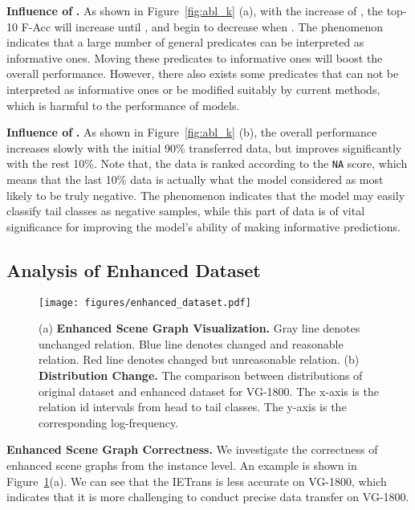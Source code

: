 \documentclass[runningheads]{llncs}
\begin{document}
\smallskip
\noindent
\textbf{Influence of }\textbf{.}
As shown in Figure~\ref{fig:abl_k} (a), with the increase of , the top-10 F-Acc will increase until , and begin to decrease when .
The phenomenon indicates that a large number of general predicates can be interpreted as informative ones.
Moving these predicates to informative ones will boost the overall performance.
However, there also exists some predicates that can not be interpreted as informative ones or be modified suitably by current methods, which is harmful to the performance of models.

\smallskip
\noindent
\textbf{Influence of }\textbf{.}
As shown in Figure~\ref{fig:abl_k} (b), the overall performance increases slowly with the initial 90\% transferred data, but improves significantly with the rest 10\%. 
Note that, the data is ranked according to the \texttt{NA} score, which means that the last 10\% data is actually what the model considered as most likely to be truly negative.
The phenomenon indicates that the model may easily classify tail classes as negative samples, while this part of data is of vital significance for improving the model's ability of making informative predictions.



\subsection{Analysis of Enhanced Dataset}


\begin{figure}[t]
    \centering
    \texttt{[image: figures/enhanced\_dataset.pdf]}
    \caption{(a) \textbf{Enhanced Scene Graph Visualization.} Gray line denotes unchanged relation. Blue line denotes changed and reasonable relation. Red line denotes changed but unreasonable relation. (b) \textbf{Distribution Change.} The comparison between distributions of original dataset and enhanced dataset for VG-1800. 
    The x-axis is the relation id intervals from head to tail classes. The y-axis is the corresponding log-frequency.}
    \label{fig:enhanced_dataset}
\end{figure}


\smallskip
\noindent
\textbf{Enhanced Scene Graph Correctness.}
We investigate the correctness of enhanced scene graphs from the instance level.
An example is shown in Figure~\ref{fig:enhanced_dataset}(a).
We can see that the IETrans is less accurate on VG-1800, which indicates that it is more challenging to conduct precise data transfer on VG-1800.
\end{document}

